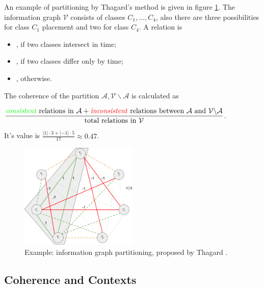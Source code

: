 \medskip

\noindent

An example of partitioning by Thagard's method is given in figure \ref{fig:UAB-partition}.
The information graph $\mathcal{V}$ consists of
classes $C_1,\dots,C_4$, also there are three possibilities for
class $C_1$ placement and two for class $C_4$. A relation is
\begin{itemize}[leftmargin=3cm]
  \item[\red{\emph{inconsistent}}], if two classes intersect in time;
  \item[\yellow{\emph{same class}}], if two classes differ only by time;
  \item[\green{\emph{consistent}}], otherwise.
\end{itemize}

\noindent
The coherence of the partition $\mathcal{A},\mathcal{V}\backslash\mathcal{A}$
          is calculated as
\medskip

$   \dfrac{ \text{{\color{green} \emph{consistent}} relations in } \mathcal{A}
          + \text{{\color{red} \emph{inconsistent}} relations between }
                  \mathcal{A} \text{ and } \mathcal{V}\backslash\mathcal{A}}
          {\text{total relations in } \mathcal{V}}$.
\medskip

\noindent
It's value is $\frac{|1| \cdot 3 + |-1| \cdot 5}{17} \approx 0.47$.


\begin{figure}[h]
  \centering
  \includegraphics[width=0.5\textwidth]{img/UAB-splitting.png} %
  \caption{Example: information graph partitioning, proposed by Thagard
           \cite{ThagVerb98, UAB-Thesis}. }
  \label{fig:UAB-partition}
\end{figure}


\subsection{Coherence and Contexts}
\label{section:coherence}

